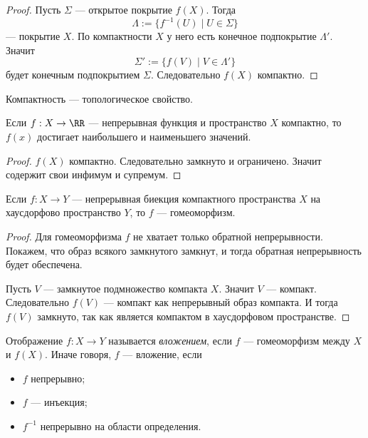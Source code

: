 \documentclass[12pt,a4paper]{article}
\begin{document}
    \begin{proof}
        Пусть $\Sigma$ --- открытое покрытие $f(X)$. Тогда
        \[\Lambda := \{f^{-1}(U) \mid U \in \Sigma\}\]
        --- покрытие $X$. По компактности $X$ у него есть конечное подпокрытие $\Lambda'$. Значит
        \[\Sigma' := \{f(V) \mid V \in \Lambda'\}\]
        будет конечным подпокрытием $\Sigma$. Следовательно $f(X)$ компактно.
    \end{proof}

    \begin{corollary}
        Компактность --- топологическое свойство.
    \end{corollary}

    \begin{theorem}[Вейерштрассса]
        Если $f: X \to \RR$ --- непрерывная функция и пространство $X$ компактно, то $f(x)$ достигает наибольшего и наименьшего значений.
    \end{theorem}

    \begin{proof}
        $f(X)$ компактно. Следовательно замкнуто и ограничено. Значит содержит свои инфимум и супремум.
    \end{proof}

    \begin{theorem}
        Если $f: X \to Y$ --- непрерывная биекция компактного пространства $X$ на хаусдорфово пространство $Y$, то $f$ --- гомеоморфизм.
    \end{theorem}

    \begin{proof}
        Для гомеоморфизма $f$ не хватает только обратной непрерывности. Покажем, что образ всякого замкнутого замкнут, и тогда обратная непрерывность будет обеспечена.

        Пусть $V$ --- замкнутое подмножество компакта $X$. Значит $V$ --- компакт. Следовательно $f(V)$ --- компакт как непрерывный образ компакта. И тогда $f(V)$ замкнуто, так как является компактом в хаусдорфовом пространстве.
    \end{proof}

    \begin{definition}
        Отображение $f: X \to Y$ называется \emph{вложением}, если $f$ --- гомеоморфизм между $X$ и $f(X)$. Иначе говоря, $f$ --- вложение, если
        \begin{itemize}
            \item $f$ непрерывно;
            \item $f$ --- инъекция;
            \item $f^{-1}$ непрерывно на области определения.
        \end{itemize}
    \end{definition}
\end{document}
